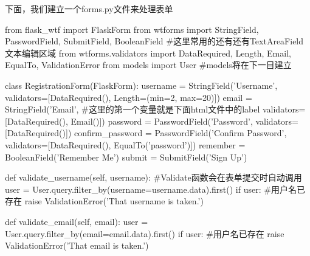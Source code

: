       下面，我们建立一个forms.py文件来处理表单
      \begin{codeblock}[language=python, caption={form.py}]
        from flask_wtf import FlaskForm
        from wtforms import StringField, PasswordField, SubmitField, BooleanField
            #这里常用的还有还有TextAreaField文本编辑区域
        from wtforms.validators import DataRequired, Length, Email, EqualTo, ValidationError
        from models import User #models将在下一目建立

        class RegistrationForm(FlaskForm):
            username = StringField('Username', 
                validators=[DataRequired(), Length=(min=2, max=20)])
            email = StringField('Email', #这里的第一个变量就是下面html文件中的label
                validators=[DataRequired(), Email()])
            password = PasswordField('Password', 
                validators=[DataRequired()])
            confirm_password = PasswordField('Confirm Password', 
                validators=[DataRequired(), EqualTo('password')])
            remember = BooleanField('Remember Me')
            submit = SubmitField('Sign Up')

            def validate_username(self, username): #Validate函数会在表单提交时自动调用
                user = User.query.filter_by(username=username.data).first()
                if user: #用户名已存在
                    raise ValidationError('That username is taken.')

            def validate_email(self, email):
                user = User.query.filter_by(email=email.data).first()
                if user: #用户名已存在
                    raise ValidationError('That email is taken.')
      \end{codeblock}

